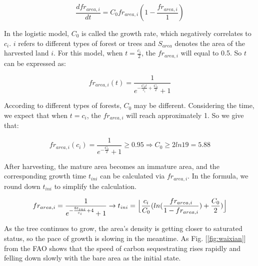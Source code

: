 \begin{equation}
    \frac{dfr_{area, i}}{dt} = C_0fr_{area, i}(1-\frac{fr_{area, i}}{1})
\end{equation}

In the logistic model, $C_0$ is called the growth rate, which negatively correlates to $c_i$. $i$ refers to different types of forest or trees and $S_{area}$ denotes the area of the harvested land $i$. For this model, when $t = \frac{c_i}{2}$, the $fr_{area, i}$ will equal to 0.5. So $t$ can be expressed as:

\begin{equation}
    fr_{area, i}(t) = \frac{1}{e^{-\frac{C_0t}{c_i} + \frac{C_0}{2}}+1} \label{N_i}
\end{equation}

According to different types of forests, $C_0$ may be different. Considering the time, we expect that when $t = c_i$, the $fr_{area, i}$ will reach approximately 1. So we give that:

\begin{equation}
    fr_{area, i}(c_i) = \frac{1}{e^{-\frac{C_0}{2}}+1} \geq 0.95
    \Rightarrow
    C_0 \geq 2ln19 = 5.88
\end{equation}

After harvesting, the mature area becomes an immature area, and the corresponding growth time $t_{ini}$ can be calculated via $fr_{area, i}$. In the formula, we round down $t_{ini}$ to simplify the calculation.

\begin{equation}
    fr_{area, i} = \frac{1}{e^{-\frac{8t_{ini}}{c_i} + 4}+1} \\\\
    \rightarrow
    t_{ini} = \Bigl\lfloor \frac{c_i}{C_0}(ln(\frac{fr_{area, i}}{1-fr_{area, i}}) + \frac{C_0}{2}) \Bigr\rfloor
\end{equation}

As the tree continues to grow, the area's density is getting closer to saturated status, so the pace of growth is slowing in the meantime. As Fig. [\ref{fig:waixian}] from the FAO shows that the speed of carbon sequestrating rises rapidly and felling down slowly with the bare area as the initial state.

